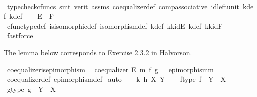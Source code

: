 \begin{isabellebody}
\ \ \ \ \isamarkupfalse%
\ {\isacharparenleft}{\kern0pt}typecheck{\isacharunderscore}{\kern0pt}cfuncs{\isacharcomma}{\kern0pt}\ smt\ {\isacharparenleft}{\kern0pt}verit{\isacharparenright}{\kern0pt}\ assms{\isacharparenleft}{\kern0pt}{}{\isacharparenright}{\kern0pt}\ coequalizer{\isacharunderscore}{\kern0pt}def\ comp{\isacharunderscore}{\kern0pt}associative{}\ id{\isacharunderscore}{\kern0pt}left{\isacharunderscore}{\kern0pt}unit{}\ k{\isacharprime}{\kern0pt}{\isacharunderscore}{\kern0pt}def\ k{\isacharunderscore}{\kern0pt}def{\isacharparenright}{\kern0pt}\isanewline
\isanewline
\ \ \isamarkupfalse%
\ {\isachardoublequoteopen}E\ {\isasymcong}\ F{\isachardoublequoteclose}\isanewline
\ \ \ \ \isamarkupfalse%
\ cfunc{\isacharunderscore}{\kern0pt}type{\isacharunderscore}{\kern0pt}def\ is{\isacharunderscore}{\kern0pt}isomorphic{\isacharunderscore}{\kern0pt}def\ isomorphism{\isacharunderscore}{\kern0pt}def\ k{\isacharprime}{\kern0pt}{\isacharunderscore}{\kern0pt}def\ k{\isacharprime}{\kern0pt}k{\isacharunderscore}{\kern0pt}idE\ k{\isacharunderscore}{\kern0pt}def\ kk{\isacharprime}{\kern0pt}{\isacharunderscore}{\kern0pt}idF\ \isamarkupfalse%
\ fastforce\isanewline
{}\isamarkupfalse%
%
\endisatagproof
{\isafoldproof}%
%
\isadelimproof
%
\endisadelimproof
%
\begin{isamarkuptext}%
The lemma below corresponds to Exercise 2.3.2 in Halvorson.%
\end{isamarkuptext}\isamarkuptrue%
\isamarkupfalse%
\ coequalizer{\isacharunderscore}{\kern0pt}is{\isacharunderscore}{\kern0pt}epimorphism{\isacharcolon}{\kern0pt}\isanewline
\ \ {\isachardoublequoteopen}coequalizer\ E\ m\ f\ g\ {\isasymLongrightarrow}\ \ epimorphism{\isacharparenleft}{\kern0pt}m{\isacharparenright}{\kern0pt}{\isachardoublequoteclose}\isanewline
%
\isadelimproof
\ \ %
\endisadelimproof
%
\isatagproof
{}\isamarkupfalse%
\ coequalizer{\isacharunderscore}{\kern0pt}def\ epimorphism{\isacharunderscore}{\kern0pt}def\isanewline
{}\isamarkupfalse%
\ auto\isanewline
\ \ \isamarkupfalse%
\ k\ h\ X\ Y\isanewline
\ \ \isamarkupfalse%
\ f{\isacharunderscore}{\kern0pt}type{\isacharcolon}{\kern0pt}\ {\isachardoublequoteopen}f\ {\isacharcolon}{\kern0pt}\ Y\ {\isasymrightarrow}\ X{\isachardoublequoteclose}\isanewline
\ \ \isamarkupfalse%
\ g{\isacharunderscore}{\kern0pt}type{\isacharcolon}{\kern0pt}\ {\isachardoublequoteopen}g\ {\isacharcolon}{\kern0pt}\ Y\ {\isasymrightarrow}\ X{\isachardoublequoteclose}\isanewline

\end{isabellebody}
